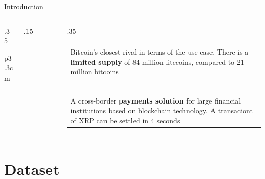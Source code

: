 \documentclass[aspectratio=169]{beamer}
\newcommand\Fontci{\fontsize{7}{7.2}\selectfont}
\begin{document}
\begin{frame}{Introduction}
\begin{columns}[T]
\begin{column}{.35\linewidth}
\begin{tabular}{p{3.3cm}}
		\end{tabular}
		\end{column}
		\vrule{}
		\hspace{10pt}
		\begin{column}{.15\linewidth}			
		\begin{figure}
			\includegraphics[height=2cm, width=2cm]{Images/ltc}
		\end{figure}
		\begin{figure}
			\includegraphics[height=2cm, width=2cm]{Images/xrp}
		\end{figure}
		\end{column}
		\begin{column}{.35\linewidth}
		\Fontci
		\begin{tabular}{p{3.3cm}}
			\\
			\\
			Bitcoin's closest rival in terms of the use case. There is a \textbf{limited supply} of 84 million litecoins, compared to 21 million bitcoins    \\
			\\
			\\
			\\
			\\
			\\
			\\
			A cross-border \textbf{payments solution} for large financial institutions based on blockchain technology. A transaciont of XRP can be settled in 4 seconds \\

		\end{tabular}
		\end{column}			
	\end{columns}
\end{frame}


\section{Dataset}
\end{document}
